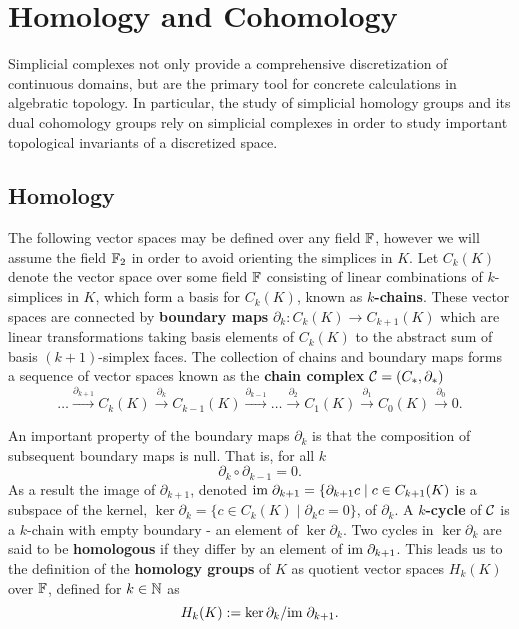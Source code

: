\section{Homology and Cohomology} %
\label{sec:homology}

Simplicial complexes not only provide a comprehensive discretization of continuous domains, but are the primary tool for concrete calculations in algebratic topology.
In particular, the study of simplicial homology groups and its dual cohomology groups rely on simplicial complexes in order to study important topological invariants of a discretized space.


\subsection{Homology}

The following vector spaces may be defined over any field $\mathbb{F}$, however we will assume the field $\mathbb{F}_2$ in order to avoid orienting the simplices in $K$.
Let $C_k(K)$ denote the vector space over some field $\mathbb{F}$ consisting of linear combinations of $k$-simplices in $K$, which form a basis for $C_k(K)$, known as \textbf{$k$-chains}.
These vector spaces are connected by \textbf{boundary maps} $\partial_k:C_k(K)\to C_{k+1}(K)$ which are linear transformations taking basis elements of $C_k(K)$ to the abstract sum of basis $(k+1)$-simplex faces.
The collection of chains and boundary maps forms a sequence of vector spaces known as the \textbf{chain complex} $\mathcal{C} = (C_*,\partial_*)$
\[
    \ldots\xrightarrow{\partial_{k+1}}
    C_k(K)\xrightarrow{\partial_{k}}
    C_{k-1}(K)\xrightarrow{\partial_{k-1}}
    \ldots\xrightarrow{\partial_2}
    C_1(K)\xrightarrow{\partial_{1}}
    C_0(K)\xrightarrow{\partial_0} 0.
\]

An important property of the boundary maps $\partial_k$ is that the composition of subsequent boundary maps is null.
That is, for all $k$
\[ \partial_k\circ\partial_{k-1} = 0. \]
As a result the image of $\partial_{k+1}$, denoted $\mathrm{im}\;\partial_{k+1} = \{\partial_{k+1}c\mid c\in C_{k+1}(K)$ is a subspace of the kernel, $\ker\partial_k = \{c\in C_k(K)\mid \partial_k c = 0\}$, of $\partial_k$.
A \textbf{$k$-cycle} of $\mathcal{C}$ is a $k$-chain with empty boundary - an element of $\ker\partial_k$.
Two cycles in $\ker\partial_k$ are said to be \textbf{homologous} if they differ by an element of $\mathrm{im}\;\partial_{k+1}$.
This leads us to the definition of the \textbf{homology groups} of $K$ as quotient vector spaces $H_k(K)$ over $\mathbb{F}$, defined for $k\in\mathbb{N}$ as
\[ H_k(K) := \ker\partial_k/\mathrm{im}\;\partial_{k+1}.\]

